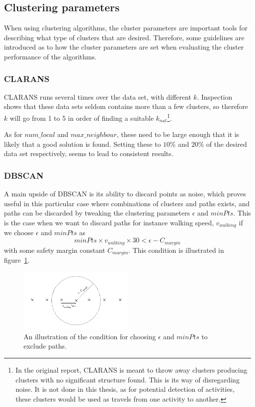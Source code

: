 \subsection{Clustering parameters}
When using clustering algorithms, the cluster parameters are important tools 
for describing what type of clusters that are desired. Therefore, some 
guidelines are introduced as to how the cluster parameters are set when 
evaluating the cluster performance of the algorithms.

\subsubsection{CLARANS}
CLARANS runs several times over the data set, with different $k$. Inspection
shows that these data sets seldom contains more than a few clusters, so therefore
$k$ will go from 1 to 5 in order of finding a suitable $k_{nat}$\footnote{
    In the original report, CLARANS is meant to throw away clusters producing
    clusters with no significant structure found. This is its way of disregarding
    noise. It is not done in this thesis, as for potential detection of 
    activities, these clusters would be used as travels from one activity to
    another. }.

As for $num\_local$ and $max\_neighbour$, these need to be large enough that
it is likely that a good solution is found. Setting these to $10\%$ and 
$20\%$ of the desired data set respectively, seems to lead to consistent results. 

\subsubsection{DBSCAN}
A main upside of DBSCAN is its ability to discard points as noise, 
which proves useful in this particular case where combinations of 
clusters and paths exists, and paths can be discarded by tweaking 
the clustering parameters $ \epsilon $ and $ minPts $. This is the case
when we want to discard paths for instance walking speed, $ v_{walking} $
if we choose  $ \epsilon $ and $ minPts $ as 
\begin{equation}
    \label{eq:minPts_eps_condition}
    minPts \times v_{walking} \times 30 < \epsilon - C_{margin}
\end{equation}
with some safety margin constant $ C_{margin} $. This condition is 
illustrated in figure~\ref{fig:epsilon_minpts_condition}.

\begin{figure}[ht]
    \centering
    \includegraphics[width=0.5\textwidth]{images/epsilon_minpts_condition.pdf}
    \caption{ An illustration of the condition for choosing $ \epsilon $ and 
              $ minPts $ to exclude paths. \label{fig:epsilon_minpts_condition} }
\end{figure}

